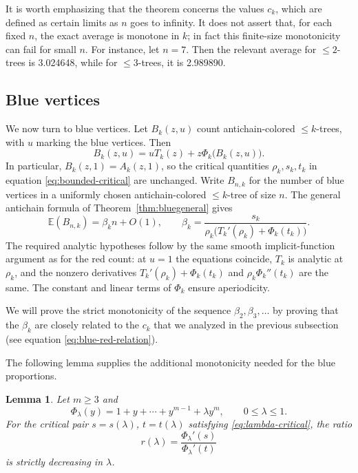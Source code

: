 \documentclass[10pt,a4paper]{amsart}
\newtheorem{lemma}[theorem]{Lemma}
\theoremstyle{remark}
\begin{document}
It is worth emphasizing that the theorem concerns the values $c_k$, which are defined as certain
limits as $n$ goes to infinity.   It does not assert that, for each fixed $n$, the exact average is monotone in $k$; in fact this finite-size monotonicity can fail for small $n$. For instance, let $n=7$. 
Then the relevant average for $\leq 2$-trees is 3.024648, while for $\leq 3$-trees, it is 2.989890.

\subsection{Blue vertices}
We now turn to blue vertices. Let $B_k(z,u)$ count antichain-colored
$\leq k$-trees, with $u$ marking the blue vertices. Then
\[
B_k(z,u)=uT_k(z)+z\Phi_k\bigl(B_k(z,u)\bigr).
\]
In particular, $B_k(z,1)=A_k(z,1)$, so the critical quantities
$\rho_k,s_k,t_k$ in equation \eqref{eq:bounded-critical} are unchanged.
Write $B_{n,k}$ for the number of blue vertices in a uniformly chosen
antichain-colored $\leq k$-tree of size $n$. The general antichain formula
of Theorem~\ref{thm:bluegeneral} gives
\begin{equation} \label{blueformula}
\mathbb E(B_{n,k})=\beta_k n+O(1),
\qquad
\beta_k=\frac{s_k}{\rho_k\bigl(T_k'(\rho_k)+\Phi_k(t_k)\bigr)}.
\end{equation}
The required analytic hypotheses follow by the same smooth
implicit-function argument as for the red count: at $u=1$ the equations
coincide, $T_k$ is analytic at $\rho_k$, and the nonzero derivatives
$T_k'(\rho_k)+\Phi_k(t_k)$ and $\rho_k\Phi_k''(t_k)$ are the same.
The constant and linear terms of $\Phi_k$ ensure aperiodicity.

We will prove the strict monotonicity of the sequence $\beta_2, \beta_3,\ldots $ by proving that the
$\beta_k$ are closely related to the $c_k$ that we analyzed in the previous subsection (see equation
\eqref{eq:blue-red-relation}).

The following lemma supplies the additional monotonicity needed for the
blue proportions.


\begin{lemma}\label{lem:blue-ratio}
Let $m\geq3$ and
\[
\Phi_\lambda(y)=1+y+\cdots+y^{m-1}+\lambda y^m,
\qquad 0\leq\lambda\leq1.
\]
For the critical pair $s=s(\lambda)$, $t=t(\lambda)$ satisfying
\eqref{eq:lambda-critical}, the ratio
\[
r(\lambda)=\frac{\Phi_\lambda'(s)}{\Phi_\lambda'(t)}
\]
is strictly decreasing in $\lambda$.
\end{lemma}
\end{document}
